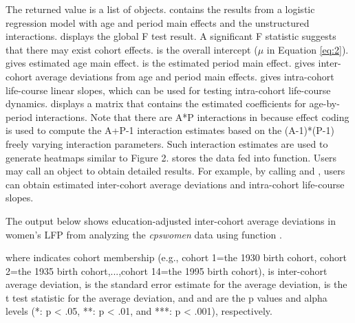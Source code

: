The returned value is a list of objects.  contains the results from a logistic regression model with age and period main effects and the unstructured interactions.  displays the global F test result. A significant F statistic suggests that there may exist cohort effects.  is the overall intercept ($\mu$ in Equation \ref{eq:2}).  gives estimated age main effect.  is the estimated period main effect.   gives inter-cohort average deviations from age and period main effects.   gives intra-cohort life-course linear slopes, which can be used for testing intra-cohort life-course dynamics.  displays a matrix that contains the estimated coefficients for age-by-period interactions.  Note that there are A*P interactions in  because effect coding is used to compute the A+P-1 interaction estimates based on the (A-1)*(P-1) freely varying interaction parameters. Such interaction estimates are used to generate heatmaps similar to Figure 2.  stores the data fed into  function. Users may call an object to obtain detailed results. For example, by calling {} and {}, users can obtain estimated inter-cohort average deviations and intra-cohort life-course slopes.

The output below shows education-adjusted inter-cohort average deviations in women's LFP from analyzing the \textit{cpswomen} data using function {}.

where  indicates cohort membership (e.g., cohort 1=the 1930 birth cohort, cohort 2=the 1935 birth  cohort,...,cohort 14=the 1995 birth cohort),  is inter-cohort average deviation,  is the standard error estimate for the average deviation,  is the t test statistic for the average deviation, and  and  are the p values and alpha levels (*: p < .05, **: p < .01, and ***: p < .001), respectively. 


